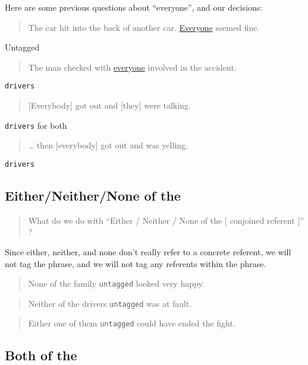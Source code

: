 \documentclass[
]{book}
\begin{document}
Here are some previous questions about ``everyone'', and our decisions:

\begin{quote}
The car hit into the back of another car.
\protect\hyperlink{everyone}{Everyone} seemed fine.
\end{quote}

Untagged

\begin{quote}
The man checked with \protect\hyperlink{everyone}{everyone} involved in the accident.
\end{quote}

\texttt{drivers}

\begin{quote}
{[}Everybody{]} got out and {[}they{]} were talking.
\end{quote}

\texttt{drivers} for both

\begin{quote}
\ldots{} then {[}everybody{]} got out and was yelling.
\end{quote}

\texttt{drivers}

\hypertarget{eitherneithernone-of-the}{%
\subsection{Either/Neither/None of the}\label{eitherneithernone-of-the}}

\begin{quote}
What do we do with ``Either / Neither / None of the {[} conjoined referent {]}'' ?
\end{quote}

Since either, neither, and none don't really refer to a concrete referent, we will not tag the phrase,
and we will not tag any referents within the phrase.

\begin{quote}
None of the family \texttt{untagged} looked very happy.
\end{quote}

\begin{quote}
Neither of the drivers \texttt{untagged} was at fault.
\end{quote}

\begin{quote}
Either one of them \texttt{untagged} could have ended the fight.
\end{quote}

\hypertarget{both-of-the}{%
\subsection{Both of the}\label{both-of-the}}
\end{document}
